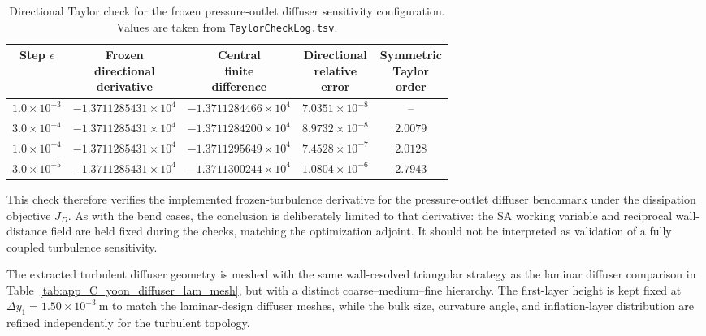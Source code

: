 \begin{table}[!ht]
	\centering
	\scriptsize
	\caption{Directional Taylor check for the frozen pressure-outlet diffuser sensitivity configuration. Values are taken from \texttt{TaylorCheckLog.tsv}.}
	\label{tab:yoon_diffuser_taylor_check}
	\renewcommand{\arraystretch}{1.2}
	\begin{tabular}{c c c c c}
		\hline
		\textbf{Step $\epsilon$} &
		\shortstack{\textbf{Frozen}\\\textbf{directional}\\\textbf{derivative}} &
		\shortstack{\textbf{Central}\\\textbf{finite}\\\textbf{difference}} &
		\shortstack{\textbf{Directional}\\\textbf{relative}\\\textbf{error}} &
		\shortstack{\textbf{Symmetric}\\\textbf{Taylor}\\\textbf{order}} \\
		\hline
		$1.0\times10^{-3}$ & $-1.3711285431\times10^{4}$ & $-1.3711284466\times10^{4}$ & $7.0351\times10^{-8}$ & -- \\
		$3.0\times10^{-4}$ & $-1.3711285431\times10^{4}$ & $-1.3711284200\times10^{4}$ & $8.9732\times10^{-8}$ & $2.0079$ \\
		$1.0\times10^{-4}$ & $-1.3711285431\times10^{4}$ & $-1.3711295649\times10^{4}$ & $7.4528\times10^{-7}$ & $2.0128$ \\
		$3.0\times10^{-5}$ & $-1.3711285431\times10^{4}$ & $-1.3711300244\times10^{4}$ & $1.0804\times10^{-6}$ & $2.7943$ \\
		\hline
	\end{tabular}
\end{table}

	This check therefore verifies the implemented frozen-turbulence derivative for the pressure-outlet diffuser benchmark under the dissipation objective $J_D$. As with the bend cases, the conclusion is deliberately limited to that derivative: the SA working variable and reciprocal wall-distance field are held fixed during the checks, matching the optimization adjoint. It should not be interpreted as validation of a fully coupled turbulence sensitivity.

\FloatBarrier

The extracted turbulent diffuser geometry is meshed with the same wall-resolved triangular strategy as the laminar diffuser comparison in Table~\ref{tab:app_C_yoon_diffuser_lam_mesh}, but with a distinct coarse--medium--fine hierarchy. The first-layer height is kept fixed at $\Delta y_1=1.50\times10^{-3}~\mathrm{m}$ to match the laminar-design diffuser meshes, while the bulk size, curvature angle, and inflation-layer distribution are refined independently for the turbulent topology.


